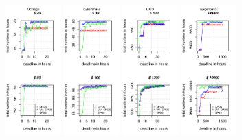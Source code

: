 \documentclass{sig-alternate}
\begin{document}
\begin{figure}[t]  
\centering
\includegraphics[width=0.19\textwidth]{figures/pareto-size-MONTAGE-n-1000-8-dagh1-20m0.pdf}
\includegraphics[width=0.19\textwidth]{figures/pareto-size-CYBERSHAKE-n-1000-8-dagh1-20m0.pdf}
\includegraphics[width=0.19\textwidth]{figures/pareto-size-LIGO-n-1000-8-dagh1-40m0.pdf}
\includegraphics[width=0.19\textwidth]{figures/pareto-size-GENOME-n-1000-8-dagh100-1500m0.pdf}

\end{figure}
\end{document}
